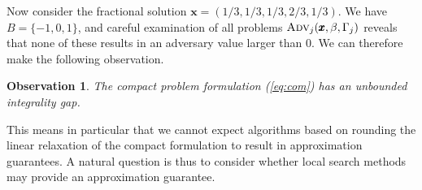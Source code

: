 \documentclass[a4paper,11pt,abstracton]{scrartcl}
\newtheorem{obs}{Observation}%
\theoremstyle{definition}
\theoremstyle{remark}
\begin{document}
Now consider the fractional solution $\pmb{x}=(1/3,1/3,1/3,2/3,1/3)$. We have $B=\{-1,0,1\}$, and careful examination of all problems $\textsc{Adv}_j(\pmb{x},\beta,\Gamma_j)$ reveals that none of these results in an adversary value larger than 0. We can therefore make the following observation.

\begin{obs}
The compact problem formulation (\ref{eq:com}) has an unbounded integrality gap.
\end{obs}

This means in particular that we cannot expect algorithms based on rounding the linear relaxation of the compact formulation to result in approximation guarantees. A natural question is thus to consider whether local search methods may provide an approximation guarantee. 
\end{document}
